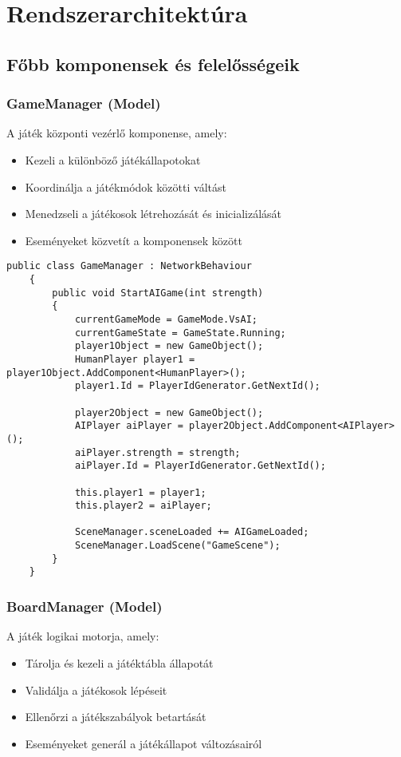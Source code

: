 \section{Rendszerarchitektúra}
\subsection{Főbb komponensek és felelősségeik}
\subsubsection{GameManager (Model)}
A játék központi vezérlő komponense, amely:
\begin{itemize}
	\item Kezeli a különböző játékállapotokat
	\item Koordinálja a játékmódok közötti váltást
	\item Menedzseli a játékosok létrehozását és inicializálását
	\item Eseményeket közvetít a komponensek között
\end{itemize}
\begin{lstlisting}[language={[Sharp]C}]
	public class GameManager : NetworkBehaviour
	{
		public void StartAIGame(int strength)
		{
			currentGameMode = GameMode.VsAI;
			currentGameState = GameState.Running;
			player1Object = new GameObject();
			HumanPlayer player1 = player1Object.AddComponent<HumanPlayer>();
			player1.Id = PlayerIdGenerator.GetNextId();
			
			player2Object = new GameObject();
			AIPlayer aiPlayer = player2Object.AddComponent<AIPlayer>();
			aiPlayer.strength = strength;
			aiPlayer.Id = PlayerIdGenerator.GetNextId();
			
			this.player1 = player1;
			this.player2 = aiPlayer;        
			
			SceneManager.sceneLoaded += AIGameLoaded;
			SceneManager.LoadScene("GameScene");
		}
	}
\end{lstlisting}
\subsubsection{BoardManager (Model)}
A játék logikai motorja, amely:
\begin{itemize}
	\item Tárolja és kezeli a játéktábla állapotát
	\item Validálja a játékosok lépéseit
	\item Ellenőrzi a játékszabályok betartását
	\item Eseményeket generál a játékállapot változásairól
\end{itemize}
